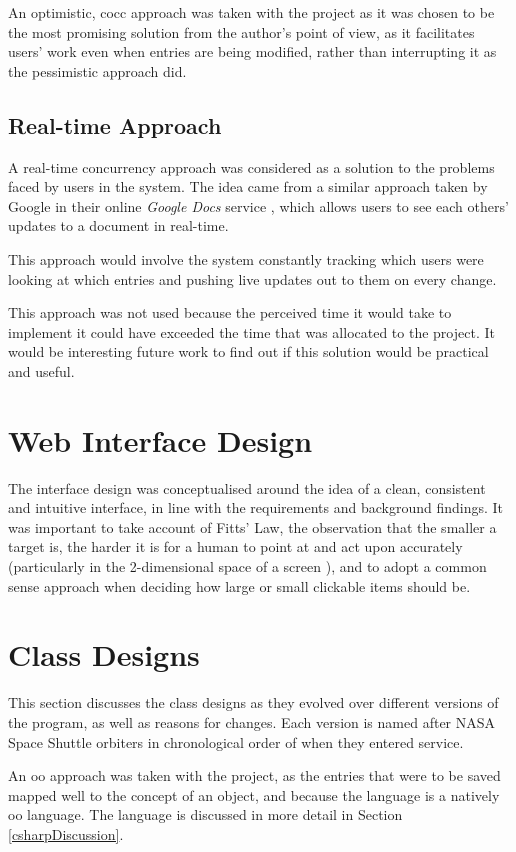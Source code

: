 An optimistic, \gls{cocc} approach was taken with the project as it was chosen to be the most promising solution from the author's point of view, as it facilitates users' work even when entries are being modified, rather than interrupting it as the pessimistic approach did.

\subsection{Real-time Approach}
A real-time concurrency approach was considered as a solution to the problems faced by users in the system.  The idea came from a similar approach taken by Google in their online \textsl{Google Docs} service \cite{googleDocs}, which allows users to see each others' updates to a document in real-time. 

This approach would involve the system constantly tracking which users were looking at which entries and pushing live updates out to them on every change.

This approach was not used because the perceived time it would take to implement it could have exceeded the time that was allocated to the project.  It would be interesting future work to find out if this solution would be practical and useful.


\section{Web Interface Design}
\label{uiDesign}
The interface design was conceptualised around the idea of a clean, consistent and intuitive interface, in line with the requirements and background findings.  It was important to take account of Fitts' Law, the observation that the smaller a target is, the harder it is for a human to point at and act upon accurately \cite{fitts} (particularly in the 2-dimensional space of a screen \cite{fitts2d}), and to adopt a common sense approach when deciding how large or small clickable items should be.

\section{Class Designs}
This section discusses the class designs as they evolved over different versions of the program, as well as reasons for changes.  Each version is named after NASA Space Shuttle orbiters in chronological order of when they entered service.

An \gls{oo} approach was taken with the project, as the entries that were to be saved mapped well to the concept of an object, and because the \cs{} language is a natively \gls{oo} language.  The \cs{} language is discussed in more detail in Section \ref{csharpDiscussion}.

